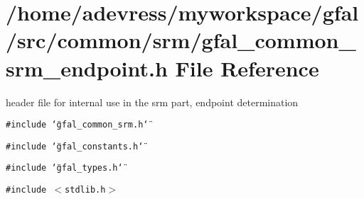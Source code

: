 \section{/home/adevress/myworkspace/gfal/src/common/srm/gfal\_\-common\_\-srm\_\-endpoint.h File Reference}
\label{gfal__common__srm__endpoint_8h}
header file for internal use in the srm part, endpoint determination 

{\tt \#include \char`\"{}gfal\_\-common\_\-srm.h\char`\"{}}\par
{\tt \#include \char`\"{}gfal\_\-constants.h\char`\"{}}\par
{\tt \#include \char`\"{}gfal\_\-types.h\char`\"{}}\par
{\tt \#include $<$stdlib.h$>$}\par
